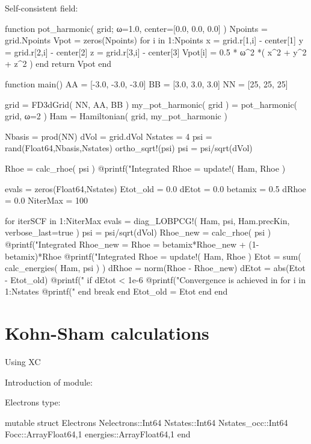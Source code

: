 Self-consistent field:
\begin{juliacode}
function pot_harmonic( grid; ω=1.0, center=[0.0, 0.0, 0.0] )
  Npoints = grid.Npoints
  Vpot = zeros(Npoints)
  for i in 1:Npoints
    x = grid.r[1,i] - center[1]
    y = grid.r[2,i] - center[2]
    z = grid.r[3,i] - center[3]
    Vpot[i] = 0.5 * ω^2 *( x^2 + y^2 + z^2 )
  end
  return Vpot
end

function main()
  AA = [-3.0, -3.0, -3.0]
  BB = [3.0, 3.0, 3.0]
  NN = [25, 25, 25]

  grid = FD3dGrid( NN, AA, BB )
  my_pot_harmonic( grid ) = pot_harmonic( grid, ω=2 )
  Ham = Hamiltonian( grid, my_pot_harmonic )

  Nbasis = prod(NN)
  dVol = grid.dVol
  Nstates = 4
  psi = rand(Float64,Nbasis,Nstates)
  ortho_sqrt!(psi)
  psi = psi/sqrt(dVol)

  Rhoe = calc_rhoe( psi )
  @printf("Integrated Rhoe = %
  update!( Ham, Rhoe )

  evals = zeros(Float64,Nstates)
  Etot_old = 0.0
  dEtot = 0.0
  betamix = 0.5
  dRhoe = 0.0
  NiterMax = 100

  for iterSCF in 1:NiterMax
    evals = diag_LOBPCG!( Ham, psi, Ham.precKin, verbose_last=true )
    psi = psi/sqrt(dVol)
    Rhoe_new = calc_rhoe( psi )
    @printf("Integrated Rhoe_new = %
    Rhoe = betamix*Rhoe_new + (1-betamix)*Rhoe
    @printf("Integrated Rhoe     = %
    update!( Ham, Rhoe )
    Etot = sum( calc_energies( Ham, psi ) )
    dRhoe = norm(Rhoe - Rhoe_new)
    dEtot = abs(Etot - Etot_old)
    @printf("%
    if dEtot < 1e-6
      @printf("Convergence is achieved in %
      for i in 1:Nstates
        @printf("%
      end
      break
    end
    Etot_old = Etot
  end
end
\end{juliacode}

\section{Kohn-Sham calculations}

Using XC

Introduction of module:

Electrons type:
\begin{juliacode}
mutable struct Electrons
  Nelectrons::Int64
  Nstates::Int64
  Nstates_occ::Int64
  Focc::Array{Float64,1}
  energies::Array{Float64,1}
end
\end{juliacode}

